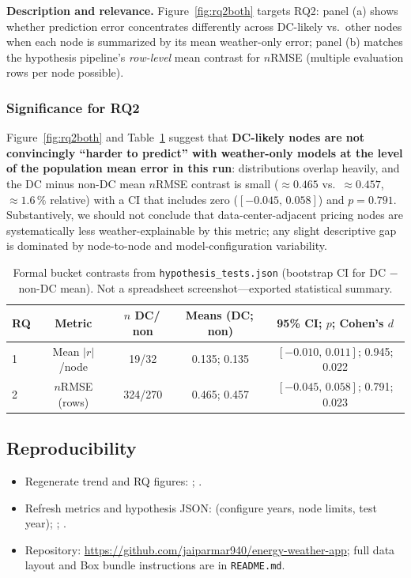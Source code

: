 \documentclass[11pt]{article}
\begin{document}
\noindent\textbf{Description and relevance.}
Figure~\ref{fig:rq2both} targets RQ2: panel (a) shows whether prediction error concentrates differently across DC-likely vs.\ other nodes when each node is summarized by its mean weather-only error; panel (b) matches the hypothesis pipeline's \emph{row-level} mean contrast for $n$RMSE (multiple evaluation rows per node possible).

\subsubsection*{Significance for RQ2}
Figure~\ref{fig:rq2both} and Table~\ref{tab:hyp} suggest that \textbf{DC-likely nodes are not convincingly ``harder to predict'' with weather-only models at the level of the population mean error in this run}: distributions overlap heavily, and the DC minus non-DC mean $n$RMSE contrast is small ($\approx\num{0.465}$ vs.\ $\approx\num{0.457}$, $\approx\num{1.6}\,\%$ relative) with a CI that includes zero ($[-0.045,\,0.058]$) and $p=\num{0.791}$.
Substantively, we should not conclude that data-center-adjacent pricing nodes are systematically less weather-explainable by this metric; any slight descriptive gap is dominated by node-to-node and model-configuration variability.

\begin{table}[H]
\centering
\small
\caption{Formal bucket contrasts from \texttt{hypothesis\_tests.json} (bootstrap CI for DC $-$ non-DC mean). Not a spreadsheet screenshot---exported statistical summary.}
\label{tab:hyp}
\begin{tabular}{@{}lcccc@{}}
\toprule
RQ & Metric & $n$ DC/\,non & Means (DC;\,non) & \num{95}\% CI; $p$; Cohen's $d$ \\
\midrule
1 & Mean $|r|$/node & \num{19}/\num{32} & \num{0.135}; \num{0.135} & $[-0.010,\,0.011]$; \num{0.945}; \num{0.022} \\
2 & $n$RMSE (rows) & \num{324}/\num{270} & \num{0.465}; \num{0.457} & $[-0.045,\,0.058]$; \num{0.791}; \num{0.023} \\
\bottomrule
\end{tabular}
\end{table}

\subsection*{Reproducibility}
\begin{itemize}
  \item Regenerate trend and RQ figures: ; .
  \item Refresh metrics and hypothesis JSON:  (configure years, node limits, test year); ; .
  \item Repository: \url{https://github.com/jaiparmar940/energy-weather-app}; full data layout and Box bundle instructions are in \texttt{README.md}.
\end{itemize}
\end{document}
